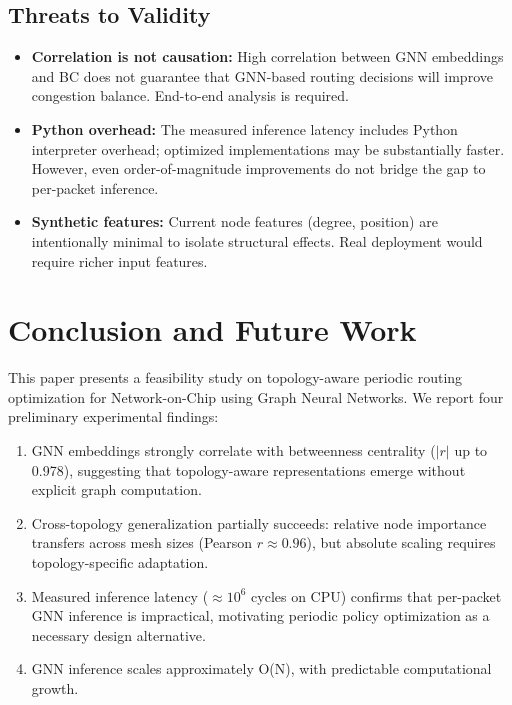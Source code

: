 \documentclass[conference]{IEEEtran}
\begin{document}
\subsection{Threats to Validity}

\begin{itemize}
    \item \textbf{Correlation is not causation:} High correlation between GNN embeddings and BC does not guarantee that GNN-based routing decisions will improve congestion balance. End-to-end analysis is required.
    \item \textbf{Python overhead:} The measured inference latency includes Python interpreter overhead; optimized implementations may be substantially faster. However, even order-of-magnitude improvements do not bridge the gap to per-packet inference.
    \item \textbf{Synthetic features:} Current node features (degree, position) are intentionally minimal to isolate structural effects. Real deployment would require richer input features.
\end{itemize}

\section{Conclusion and Future Work}
\label{sec:conclusion}

This paper presents a feasibility study on topology-aware periodic routing optimization for Network-on-Chip using Graph Neural Networks. We report four preliminary experimental findings:

\begin{enumerate}
    \item GNN embeddings strongly correlate with betweenness centrality ($|r|$ up to 0.978), suggesting that topology-aware representations emerge without explicit graph computation.
    \item Cross-topology generalization partially succeeds: relative node importance transfers across mesh sizes (Pearson $r \approx 0.96$), but absolute scaling requires topology-specific adaptation.
    \item Measured inference latency ($\approx 10^6$ cycles on CPU) confirms that per-packet GNN inference is impractical, motivating periodic policy optimization as a necessary design alternative.
    \item GNN inference scales approximately O(N), with predictable computational growth.
\end{enumerate}
\end{document}
